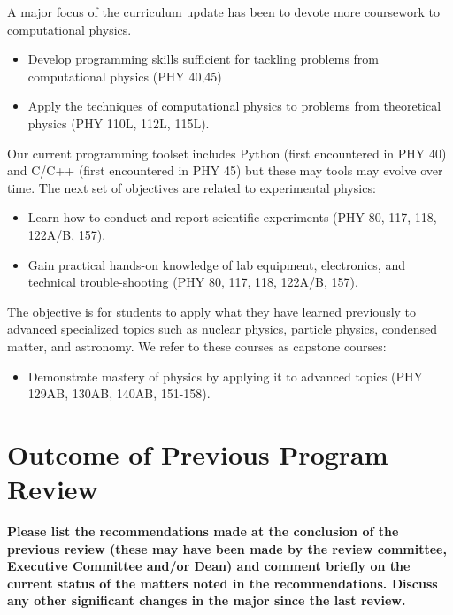 \documentclass[12pt]{article}
\begin{document}
A major focus of the curriculum update has been to devote more coursework to computational physics.
\begin{itemize}
 \item Develop programming skills sufficient for tackling problems from computational physics (PHY 40,45)
 \item Apply the techniques of computational physics to problems from theoretical physics (PHY 110L, 112L, 115L).
\end{itemize}
Our current programming toolset includes Python (first encountered in
PHY 40) and C/C++ (first encountered in PHY 45) but these may tools
may evolve over time.  The next set of objectives are related to
experimental physics:
\begin{itemize}
 \item Learn how to conduct and report scientific experiments (PHY 80, 117, 118, 122A/B, 157).
 \item Gain practical hands-on knowledge of lab equipment, electronics, and technical trouble-shooting (PHY 80, 117, 118, 122A/B, 157).
\end{itemize}
The objective is for students to apply what they have learned previously to advanced specialized topics such as nuclear physics, particle physics, condensed matter, and astronomy.  We refer to these courses as capstone courses:
\begin{itemize}
 \item Demonstrate mastery of physics by applying it to advanced topics (PHY 129AB, 130AB, 140AB, 151-158).
\end{itemize}

\newpage
\section{Outcome of Previous Program Review}
\label{sec:previous}

{\bf Please list the recommendations made at the conclusion of the previous review (these may have been made by the review committee, Executive Committee and/or Dean) and comment briefly on the current status of the matters noted in the recommendations. Discuss any other significant changes in the major since the last review.}\\
\end{document}
